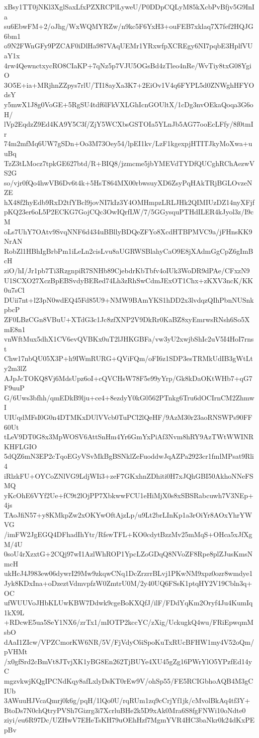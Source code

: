 xBsy1TT0jNKl3XglSaxLfxPZXRCPlLyweU/P0DDpCQLyM85kXcbPvBfjv5G9InIa
su6EbwFM+2/oJhg/WxWQMYRZw/n9kc5F6YxH3+ouFEB7xklaq7X7fef2HQJG6bm1
o9N2FWnGFy9PZCAF0iDlHa987VAqUEMr1YRxwfpXCREgy6NI7pqbE3HplfVUaY1x
4rw4QewnctxycRO8CIaKP+7qNz5p7VJU5OGsBd4zTleo4nRe/WvTiy8txG08YgiO
3O5E+ia+MRjhnZZpys7rlU/TI18ayXa3K7+2EiOv1V4q6FYPL5d0ZNWghHFYOdsY
y5mwX1J8g0VoGE+5RgSU4tdf6lFkVXLGhIcnGOUltX/1cDg3nvOEkaQoqa3G6oH/
lVp2EqdzZ9Ed4KA9Y5C3f/ZjY5WCXbsGSTOIa5YLnJb5AG77ooEcLFfy/8f0tmIr
74m2mfMq6UW7gSDn+Oo3M73Oey54/lpEI1kv/LzF1kgexpjHTITJkyMoXwa+uuBq
TzZ3tLMocz7tpkGE627btd/R+BIQ8/jzmcme5jbYMEVdTYDfQUCghRChAezwVS2G
so/vjr0fQo4hwVB6Dv6t4k+5HsT864MX00rbwsuyXD6ZsyPqHAkTRjBGLOvzeNZE
hX48f2hyEdb9RxD2tfYBcl9jovNI7kIz3Y4OMHmpzLRLJHk2QIMIUzDZ14nyXFjf
pKQ23er6oL5P2ECKG7GojCQc3OwIQrfLW/7/5GGysquPTHdILER4kJyol3z/I9cM
oLs7UhY7OAtv9SvqNNF6d434uBBllyBDQeZFYo8XcdHTBPMVC9a/jFHnsKK9NrAN
RobZl1HBhIgBrbPm1iLeLn2cisLvu8aUGRWSBlahyCaO9E8jXAdmGgCpZ6gImBcH
ziO/hI/Jr1pb7Ti3RzgnpiR7SNHb89CjebdrKbTbfv4oIUk3WoDR9dPAe/CFxzN9
U1SCXO27XczBpEBSvdyBERed74Lh3zRhSwCdmJExOT1Chx+zKXV3ncK/KK0u7sCl
DUii7nt+l23pN0wdEQ45Fd85U9+NMW9BAmYKS1hDD2x3lvdqzQIhPbnNUSnkpbcP
ZF0LBzCGn8VBuU+XTdG3c1Jc8zfXNP2V9DkRr0KaBZ8xyEmrwsRNsh6So5XmE8n1
vnWftMux5dhX1CV6evQVBKx0uT2lJHKGBFa/vw3yU2xwjbShIc2uV5I4HoI7rnst
Chw17nbQU05X3P+h9IWmRURG+QViFQm/oFI6z1SDP3esTRMkUdIB3gWtLty2m3lZ
AJpJcTOKQ8Vj6MdsUpz6oI+cQVCHsW78F5e99yYrp/Gk8kDaOKtWHb7+qG7F9uuP
G/6Uws3bfhh/qmEDkB9lju+ce4+8ezdyY0kG0562PTnkg6Tru6dOCIrnCM2ZhmwI
UIUqdMFsI0G0n4DTMKxDUlVVcb0TuPCl2lQeHF/9AzM30r23aoRNSWPs90FF60Ut
tLeV9DT0G8x3MpWOSV6AttSnHm4Yr6GmYxPiAf3Nvm8hRY9AzTWtWWINRKHFLGIO
5dQZ6mN3EP2cTqoEGyVSvMkBgBSNklZeFuoddwJqAZPa2923cr1fmlMPsat9Rli4
iRlzkFU+OYCoZNlVG9LdjWIi3+zeF7GKxhnZDhiti0H7xJQhGBI50AkhoNNeFSMQ
yKcOhE6VYf2Ue+fC9t2lOjPP7XbkwwFCU1eHiMjX0s8xSBSRabcuwh7V3NEp+4js
TAoJfiN57+y8KMkpZw2xOKYwOftAjzLp/u9Lt2brLInKp1a3rOiYr8AOxYhrYWVG
/imFW2JgEGQ4DFhadIhYtr/RfswTFL+KO0cdytBzzMv25mMqS+OHca5xJfXgM/4U
0soU4rXzxtG+2CQj97wI1AzlWhROP1YpcLZoGDqQ8NVoZF8Rpe8plZJusKmsNmcH
ukHcJ4J983ew06dywrI29Mw9zkqwCNq1DcZrzrrBLvj1PKwNM9xpz0ozr8wmdye1
Jyk8KDxIna+oDzeztVdmvpfzW0ZmtrU0M/2y40UQ6FSsK1ptqHY2V19Cbln3q+OC
ufWUUVoJHbKLUwKBW7Ddwk9cgeBoKXQfJ/ilF/FDdYqKm2Oryf4Ju4KumIq1kX9L
+RDcwE5ua5SeY1NX6/zrTx1/mIOTP2kccYC/zXig/UckugkQ4wu/FRiEpwqmMsbO
dAaI1ZIcw/VPZCmorKW6NR/5V/FjVdyC6iSpoKuTxRUcBFHW1my4V52oQm/pVHMt
/x0gfSrd2cBmVt8JTvjXK1yBG8En262TjBUYe4XU45gZg16PWrYlO5YPzfEd14yC
mgzvkwjKQgIPCNdKqy8afLxlyDsKT0rEw9V/ohSp55/FE5RCIGbhoAQB4M3gCIUb
3AWuuHJVcaQmrj0k6g/pqH/1lQo0U/rqRUm1zq9cCrjYf1jk/cMvolBkAq4tf3Y+
BtoDs7N0chQtryPVSh7Gizrg3i7XcrluBHe2k5D9xAk0Mra6S8fgFNWi10oNdte0
ziyi/eu6R97Dc/UZHwV7EHeTsKH79uOEhHzf7MgmYVR4HC3baNkr0k24dKxPEpBv
